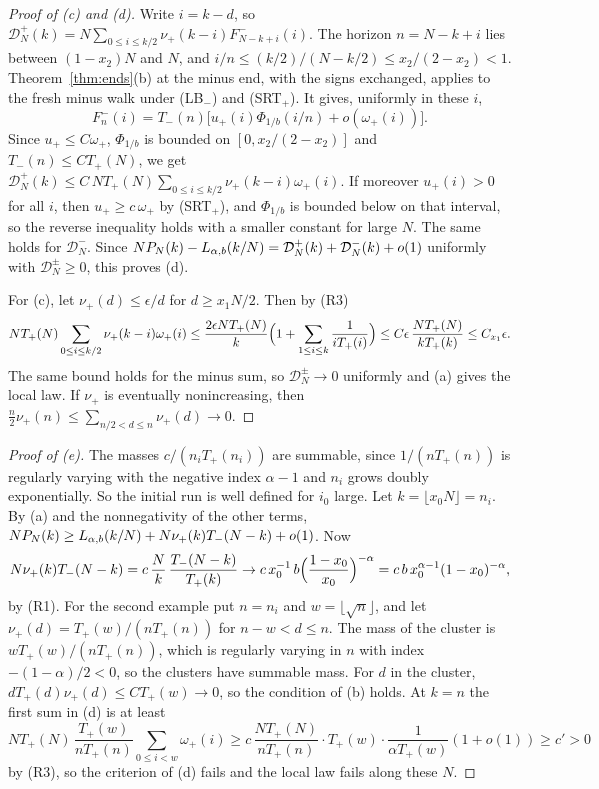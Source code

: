 \begin{proof}[Proof of (c) and (d)]
Write $i=k-d$, so $\mathcal D^\plus_N(k)=N\sum_{0\le i\le k/2}\nu_\plus(k-i)F^\minus_{N-k+i}(i)$.
The horizon $n=N-k+i$ lies between $(1-x_2)N$ and $N$, and
$i/n\le(k/2)/(N-k/2)\le x_2/(2-x_2)<1$. Theorem~\ref{thm:ends}(b) at the minus end, with
the signs exchanged, applies to the fresh minus walk under (LB$_\minus$) and (SRT$_\plus$).
It gives, uniformly in these $i$,
\[
 F^\minus_n(i)=T_\minus(n)\bigl[u_\plus(i)\Phi_{1/b}(i/n)+o(\omega_\plus(i))\bigr].
\]
Since $u_\plus\le C\omega_\plus$, $\Phi_{1/b}$ is bounded on $[0,x_2/(2-x_2)]$ and
$T_\minus(n)\le CT_\plus(N)$, we get
$\mathcal D^\plus_N(k)\le C\,NT_\plus(N)\sum_{0\le i\le k/2}\nu_\plus(k-i)\omega_\plus(i)$. If
moreover $u_\plus(i)>0$ for all $i$, then $u_\plus\ge c\,\omega_\plus$ by (SRT$_\plus$), and
$\Phi_{1/b}$ is bounded below on that interval, so the reverse inequality holds with a
smaller constant for large $N$. The same holds for $\mathcal D^\minus_N$. Since
$NP_N(k)-L_{\alpha,b}(k/N)=\mathcal D^{+}_N(k)+\mathcal D^{-}_N(k)+o(1)$ uniformly with
$\mathcal D^\pm_N\ge0$, this proves (d).

For (c), let $\nu_\plus(d)\le\epsilon/d$ for $d\ge x_1N/2$. Then by (R3)
\[
 NT_{+}(N)\sum_{0\le i\le k/2}\nu_{+}(k-i)\omega_{+}(i)\le\frac{2\epsilon NT_{+}(N)}k
 \Bigl(1+\sum_{1\le i\le k}\frac1{iT_{+}(i)}\Bigr)\le C\epsilon\,\frac{NT_{+}(N)}{kT_{+}(k)}\le C_{x_1}\epsilon .
\]
The same bound holds for the minus sum, so $\mathcal D^\pm_N\to0$ uniformly and (a) gives
the local law. If $\nu_\plus$ is eventually nonincreasing, then
$\frac n2\nu_\plus(n)\le\sum_{n/2<d\le n}\nu_\plus(d)\to0$.
\end{proof}

\begin{proof}[Proof of (e)]
The masses $c/(n_iT_\plus(n_i))$ are summable, since $1/(nT_\plus(n))$ is regularly varying
with the negative index $\alpha-1$ and $n_i$ grows doubly exponentially. So the initial run
is well defined for $i_0$ large. Let $k=\lfloor x_0N\rfloor=n_i$. By (a) and the
nonnegativity of the other terms,
$NP_N(k)\ge L_{\alpha,b}(k/N)+N\nu_{+}(k)T_{-}(N-k)+o(1)$. Now
\[
 N\nu_{+}(k)T_{-}(N-k)=c\,\frac Nk\,\frac{T_{-}(N-k)}{T_{+}(k)}\to
 c\,x_0^{-1}\,b\Bigl(\frac{1-x_0}{x_0}\Bigr)^{-\alpha}=c\,b\,x_0^{\alpha-1}(1-x_0)^{-\alpha},
\]
by (R1). For the second example put $n=n_i$ and $w=\lfloor\sqrt n\rfloor$, and let
$\nu_\plus(d)=T_\plus(w)/(nT_\plus(n))$ for $n-w<d\le n$. The mass of the cluster is
$wT_\plus(w)/(nT_\plus(n))$, which is regularly varying in $n$ with index $-(1-\alpha)/2<0$,
so the clusters have summable mass. For $d$ in the cluster,
$dT_\plus(d)\nu_\plus(d)\le CT_\plus(w)\to0$, so the condition of (b) holds. At $k=n$ the
first sum in (d) is at least
\[
 NT_\plus(N)\,\frac{T_\plus(w)}{nT_\plus(n)}\sum_{0\le i<w}\omega_\plus(i)
 \ge c\,\frac{NT_\plus(N)}{nT_\plus(n)}\cdot T_\plus(w)\cdot\frac1{\alpha T_\plus(w)}(1+o(1))\ge c'>0
\]
by (R3), so the criterion of (d) fails and the local law fails along these $N$.
\end{proof}

